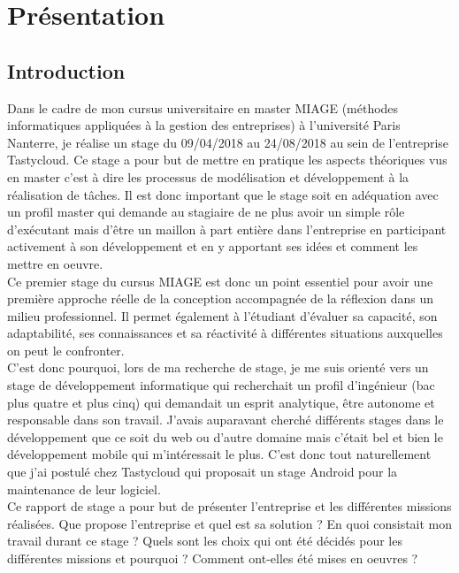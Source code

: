 

\chapter{Présentation}
\label{chap:presentation}

\section{Introduction}
Dans le cadre de mon cursus universitaire en master MIAGE (méthodes informatiques appliquées à la gestion des entreprises) à l'université Paris Nanterre, je réalise un stage du 09/04/2018 au 24/08/2018 au sein de l'entreprise Tastycloud. Ce stage a pour but de mettre en pratique les aspects théoriques vus en master c'est à dire les processus de modélisation et développement à la réalisation de tâches. Il est donc important que le stage soit en adéquation avec un profil master qui demande au stagiaire de ne plus avoir un simple rôle d'exécutant mais d'être un maillon à part entière dans l'entreprise en participant activement à son développement et en y apportant ses idées et comment les mettre en oeuvre.\\

Ce premier stage du cursus MIAGE est donc un point essentiel pour avoir une première approche réelle de la conception accompagnée de la réflexion dans un milieu professionnel. Il permet également à l'étudiant d’évaluer sa capacité, son adaptabilité, ses connaissances et sa réactivité à différentes situations auxquelles on peut le confronter.\\

C'est donc pourquoi, lors de ma recherche de stage, je me suis orienté vers un stage de développement informatique qui recherchait un profil d'ingénieur (bac plus quatre et plus cinq) qui demandait un esprit analytique, être autonome et responsable dans son travail. J'avais auparavant cherché différents stages dans le développement que ce soit du web ou d'autre domaine mais c'était bel et bien le développement mobile qui m'intéressait le plus. C'est donc tout naturellement que j'ai postulé chez Tastycloud qui proposait un stage Android pour la maintenance de leur logiciel.\\

Ce rapport de stage a pour but de présenter l'entreprise et les différentes missions réalisées. Que propose l'entreprise et quel est sa solution ? En quoi consistait mon travail durant ce stage ? Quels sont les choix qui ont été décidés pour les différentes missions et pourquoi ? Comment ont-elles été mises en oeuvres ?\\

